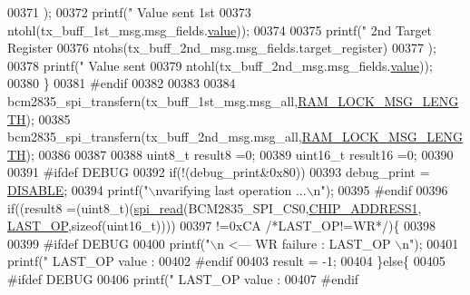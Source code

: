 \begin{DoxyCode}
{{00371        );
00372        printf(\textcolor{stringliteral}{"       Value sent 1st  %
00373        ntohl(tx\_buff\_1st\_msg.msg\_fields.\hyperlink{a00011_a638e4503e0ae6ce655b7ad2e17e8f0ad}{value}));
00374        
00375        printf(\textcolor{stringliteral}{"       2nd Target Register %
00376        ntohs(tx\_buff\_2nd\_msg.msg\_fields.target\_register)
00377        );
00378        printf(\textcolor{stringliteral}{"       Value sent  %
00379        ntohl(tx\_buff\_2nd\_msg.msg\_fields.\hyperlink{a00011_a638e4503e0ae6ce655b7ad2e17e8f0ad}{value}));
00380        \}
00381 \textcolor{preprocessor}{    #endif}
00382 \textcolor{preprocessor}{}
00383     
00384     bcm2835\_spi\_transfern(tx\_buff\_1st\_msg.msg\_all,\hyperlink{a00040_ab38a2f23d72262bab020eb973958f37b}{RAM\_LOCK\_MSG\_LENGTH});
00385     bcm2835\_spi\_transfern(tx\_buff\_2nd\_msg.msg\_all,\hyperlink{a00040_ab38a2f23d72262bab020eb973958f37b}{RAM\_LOCK\_MSG\_LENGTH});
00386 
00387     
00388     uint8\_t  result8  =0;
00389     uint16\_t result16 =0;
00390     
00391 \textcolor{preprocessor}{     #ifdef DEBUG }
00392 \textcolor{preprocessor}{}     \textcolor{keywordflow}{if}(!(debug\_print&0x80))
00393      debug\_print = \hyperlink{a00036_a99496f7308834e8b220f7894efa0b6ab}{DISABLE};
00394        printf(\textcolor{stringliteral}{"\(\backslash\)nvarifying last operation  ...\(\backslash\)n"});
00395 \textcolor{preprocessor}{     #endif}
00396 \textcolor{preprocessor}{}     \textcolor{keywordflow}{if}((result8 =(uint8\_t)(\hyperlink{a00006_ga7ad9f65ee46aca507374096506a0b1c4}{spi\_read}(BCM2835\_SPI\_CS0,\hyperlink{a00036_a94de2b046db6e10257ef4481c0a15eaa}{CHIP\_ADDRESS1},
      \hyperlink{a00035_aed1301248abf6c26045727a190f6550a}{LAST\_OP},\textcolor{keyword}{sizeof}(uint16\_t))))
00397      !=0xCA \textcolor{comment}{/*LAST\_OP!=WR*/})\{
00398              
00399 \textcolor{preprocessor}{     #ifdef DEBUG}
00400 \textcolor{preprocessor}{}       printf(\textcolor{stringliteral}{"\(\backslash\)n                                               <---  WR failure : LAST\_OP \(\backslash\)n"});
00401        printf(\textcolor{stringliteral}{"        LAST\_OP value  :%
00402 \textcolor{preprocessor}{     #endif}
00403 \textcolor{preprocessor}{}     result = -1;
00404      \}\textcolor{keywordflow}{else}\{
00405 \textcolor{preprocessor}{      #ifdef DEBUG}
00406 \textcolor{preprocessor}{}       printf(\textcolor{stringliteral}{"        LAST\_OP value  :%
00407 \textcolor{preprocessor}{     #endif}
}}}}}}}
\end{DoxyCode}
